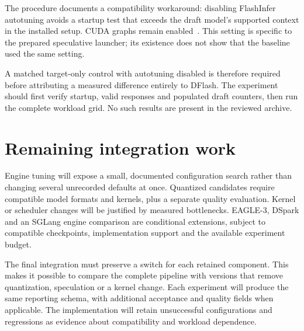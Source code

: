 The procedure documents a compatibility workaround: disabling FlashInfer autotuning avoids a startup test that exceeds the draft model's supported context in the installed setup. CUDA graphs remain enabled~\cite{procedure}. This setting is specific to the prepared speculative launcher; its existence does not show that the baseline used the same setting.

A matched target-only control with autotuning disabled is therefore required before attributing a measured difference entirely to DFlash. The experiment should first verify startup, valid responses and populated draft counters, then run the complete workload grid. No such results are present in the reviewed archive.


\section{Remaining integration work}
Engine tuning will expose a small, documented configuration search rather than changing several unrecorded defaults at once. Quantized candidates require compatible model formats and kernels, plus a separate quality evaluation. Kernel or scheduler changes will be justified by measured bottlenecks. EAGLE-3, DSpark and an SGLang engine comparison are conditional extensions, subject to compatible checkpoints, implementation support and the available experiment budget.

The final integration must preserve a switch for each retained component. This makes it possible to compare the complete pipeline with versions that remove quantization, speculation or a kernel change. Each experiment will produce the same reporting schema, with additional acceptance and quality fields when applicable. The implementation will retain unsuccessful configurations and regressions as evidence about compatibility and workload dependence.
